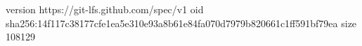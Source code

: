 version https://git-lfs.github.com/spec/v1
oid sha256:14f117c38177cfe1ea5e310e93a8b61e84fa070d7979b820661c1ff591bf79ea
size 108129
